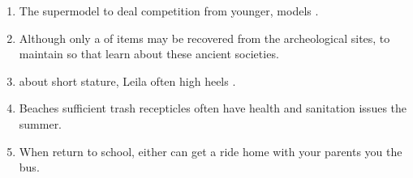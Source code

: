 \begin{enumerate}
\item \begin{inparaenum}[A]
The supermodel  to deal  competition from younger,  models . 
\end{inparaenum}

\item \begin{inparaenum}[A]
Although only a  of items may be recovered from the archeological sites,  to maintain  so that learn about these ancient societies. 
\end{inparaenum}

\item \begin{inparaenum}[A]
 about  short stature, Leila often  high heels . 
\end{inparaenum}

\item \begin{inparaenum}[A]
Beaches  sufficient trash recepticles often  have  health and sanitation issues  the summer. 
\end{inparaenum}

\item \begin{inparaenum}[A]
When  return to school, either  can get a ride home with your parents  you  the bus. 
\end{inparaenum}


\end{enumerate}
